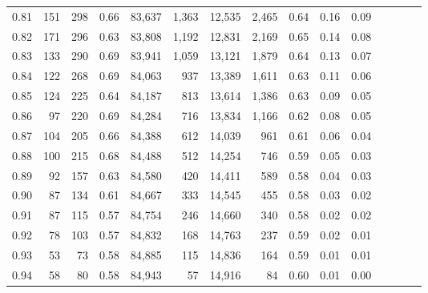 \begin{tabular}{rrrcrrrrrrrrrrr}
0.81 &    151 &  298 &                                       0.66 &  83,637 &   1,363 &  12,535 &   2,465 &  0.64 &  0.16 &                         0.09 \\
0.82 &    171 &  296 &                                       0.63 &  83,808 &   1,192 &  12,831 &   2,169 &  0.65 &  0.14 &                         0.08 \\
0.83 &    133 &  290 &                                       0.69 &  83,941 &   1,059 &  13,121 &   1,879 &  0.64 &  0.13 &                         0.07 \\
0.84 &    122 &  268 &                                       0.69 &  84,063 &     937 &  13,389 &   1,611 &  0.63 &  0.11 &                         0.06 \\
0.85 &    124 &  225 &                                       0.64 &  84,187 &     813 &  13,614 &   1,386 &  0.63 &  0.09 &                         0.05 \\
0.86 &     97 &  220 &                                       0.69 &  84,284 &     716 &  13,834 &   1,166 &  0.62 &  0.08 &                         0.05 \\
0.87 &    104 &  205 &                                       0.66 &  84,388 &     612 &  14,039 &     961 &  0.61 &  0.06 &                         0.04 \\
0.88 &    100 &  215 &                                       0.68 &  84,488 &     512 &  14,254 &     746 &  0.59 &  0.05 &                         0.03 \\
0.89 &     92 &  157 &                                       0.63 &  84,580 &     420 &  14,411 &     589 &  0.58 &  0.04 &                         0.03 \\
0.90 &     87 &  134 &                                       0.61 &  84,667 &     333 &  14,545 &     455 &  0.58 &  0.03 &                         0.02 \\
0.91 &     87 &  115 &                                       0.57 &  84,754 &     246 &  14,660 &     340 &  0.58 &  0.02 &                         0.02 \\
0.92 &     78 &  103 &                                       0.57 &  84,832 &     168 &  14,763 &     237 &  0.59 &  0.02 &                         0.01 \\
0.93 &     53 &   73 &                                       0.58 &  84,885 &     115 &  14,836 &     164 &  0.59 &  0.01 &                         0.01 \\
0.94 &     58 &   80 &                                       0.58 &  84,943 &      57 &  14,916 &      84 &  0.60 &  0.01 &                         0.00 \\

\end{tabular}
